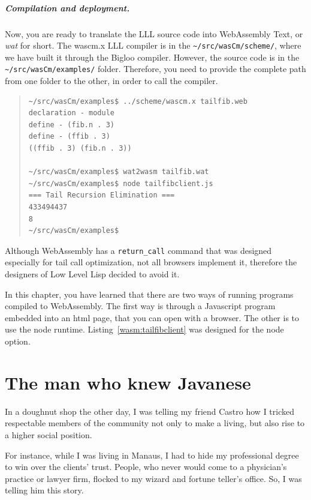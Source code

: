 \documentclass[a4paper,12pt]{book}
\begin{document}
\paragraph{Compilation and deployment.}
Now, you are ready to translate the LLL source code into
WebAssembly Text, or {\em wat} for short. The wascm.x
LLL compiler is in the \verb|~/src/wasCm/scheme/|, where
we have built it through the Bigloo compiler. However,
the source code is in the \verb|~/src/wasCm/examples/|
folder. Therefore, you need to provide the complete path
from one folder to the other, in order to call the
compiler.
\begin{quote}
\begin{verbatim}
~/src/wasCm/examples$ ../scheme/wascm.x tailfib.web
declaration - module
define - (fib.n . 3)
define - (ffib . 3)
((ffib . 3) (fib.n . 3))

~/src/wasCm/examples$ wat2wasm tailfib.wat
~/src/wasCm/examples$ node tailfibclient.js
=== Tail Recursion Elimination ===
433494437
8
~/src/wasCm/examples$
\end{verbatim}
\end{quote}


 Although WebAssembly has
a \verb|return_call| command that was designed especially
for tail call optimization, not all browsers implement
it, therefore the designers of Low Level Lisp decided
to avoid it.

In this chapter, you have learned that there are two
ways of running programs compiled to WebAssembly.
The first way is through a Javascript program embedded
into an html page, that you can open with a browser.
The other is to use the node runtime.
Listing~\ref{wasm:tailfibclient} was designed for the
node option.





\chapter{The man who knew Javanese}
In a doughnut shop the other day,
I was telling my friend Castro
how I tricked respectable members of the
community not only to make a living,
but also rise to a higher social position.

For instance, while I was living in Manaus,
I had to hide my professional degree to win
over the clients' trust. People, who never would
come to a physician's practice or lawyer firm,
flocked to my wizard and fortune teller's office.
So, I was telling him this story.
\end{document}
